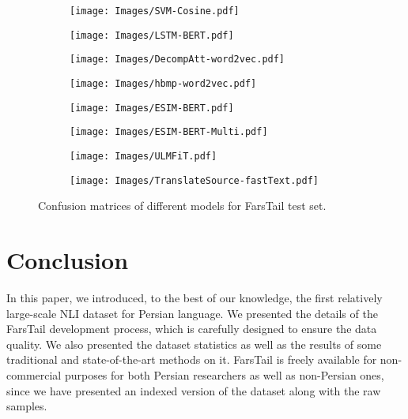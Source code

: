 \documentclass[preprint,12pt]{elsarticle}
\begin{document}
\begin{figure}[t!]
    \begin{subfigure}{0.40\textwidth}
        \texttt{[image: Images/SVM-Cosine.pdf]}
    \end{subfigure}
    \begin{subfigure}{0.4\textwidth}
        \texttt{[image: Images/LSTM-BERT.pdf]}
    \end{subfigure}
    
    \begin{subfigure}{0.4\textwidth}
        \texttt{[image: Images/DecompAtt-word2vec.pdf]}
    \end{subfigure}
    \begin{subfigure}{0.4\textwidth}
        \texttt{[image: Images/hbmp-word2vec.pdf]}
    \end{subfigure}
    
    \begin{subfigure}{0.4\textwidth}
        \texttt{[image: Images/ESIM-BERT.pdf]}
    \end{subfigure}
    \begin{subfigure}{0.4\textwidth}
        \texttt{[image: Images/ESIM-BERT-Multi.pdf]}
    \end{subfigure}
    
    \begin{subfigure}{0.4\textwidth}
        \texttt{[image: Images/ULMFiT.pdf]}
    \end{subfigure}
    \begin{subfigure}{0.4\textwidth}
        \texttt{[image: Images/TranslateSource-fastText.pdf]}
    \end{subfigure}
    \caption{Confusion matrices of different models for FarsTail test set.}
    \label{fig:confusion}
\end{figure}

\section{Conclusion}
In this paper, we introduced, to the best of our knowledge, the first relatively large-scale NLI dataset for Persian language. We presented the details of the FarsTail development process, which is carefully designed to ensure the data quality. We also presented the dataset statistics as well as the results of some traditional and state-of-the-art methods on it. FarsTail is freely available for non-commercial purposes for both Persian researchers as well as non-Persian ones, since we have presented an indexed version of the dataset along with the raw samples. 
\end{document}
